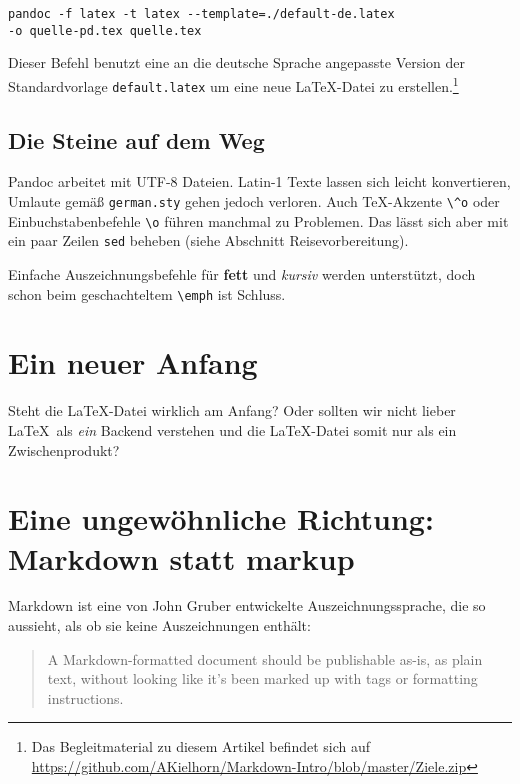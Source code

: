 \documentclass[11pt,ngerman,a4paper]{article}
\begin{document}
\begin{verbatim}
pandoc -f latex -t latex --template=./default-de.latex 
-o quelle-pd.tex quelle.tex
\end{verbatim}

Dieser Befehl benutzt eine an die deutsche Sprache angepasste Version
der Standardvorlage \texttt{default.latex} um eine neue LaTeX-Datei zu
erstellen.\footnote{Das Begleitmaterial zu diesem Artikel befindet sich
  auf
  \url{https://github.com/AKielhorn/Markdown-Intro/blob/master/Ziele.zip}}

\subsection{Die Steine auf dem Weg}

Pandoc arbeitet mit UTF-8 Dateien. Latin-1 Texte lassen sich leicht
konvertieren, Umlaute gemäß \texttt{german.sty} gehen jedoch verloren.
Auch TeX-Akzente \texttt{\textbackslash{}\^{}o} oder
Einbuchstabenbefehle \texttt{\textbackslash{}o} führen manchmal zu
Problemen. Das lässt sich aber mit ein paar Zeilen \texttt{sed} beheben
(siehe Abschnitt Reisevorbereitung).

Einfache Auszeichnungsbefehle für \textbf{fett} und \emph{kursiv} werden
unterstützt, doch schon beim geschachteltem
\texttt{\textbackslash{}emph} ist Schluss.

\section{Ein neuer Anfang}

Steht die LaTeX-Datei wirklich am Anfang? Oder sollten wir nicht lieber
LaTeX~als \emph{ein} Backend verstehen und die LaTeX-Datei somit nur als
ein Zwischenprodukt?

\section{Eine ungewöhnliche Richtung: Markdown statt markup}

Markdown ist eine von John Gruber\autocite{gruber} entwickelte
Auszeichnungssprache, die so aussieht, als ob sie keine Auszeichnungen
enthält:

\begin{quote}
A Markdown-formatted document should be publishable as-is, as plain
text, without looking like it's been marked up with tags or formatting
instructions.
\end{quote}
\end{document}
